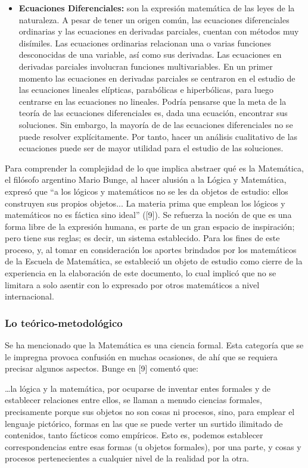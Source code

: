 \begin{itemize}
    \color{blue} \item \color{black} \textbf{Ecuaciones Diferenciales:} son la expresión matemática de las leyes de la naturaleza. A pesar de tener un origen común, las ecuaciones diferenciales ordinarias y las ecuaciones en derivadas parciales, cuentan con métodos muy disímiles. Las ecuaciones ordinarias relacionan una o varias funciones desconocidas de una variable, así como sus derivadas. Las ecuaciones en derivadas parciales involucran funciones multivariables. En un primer momento las ecuaciones en derivadas parciales se centraron en el estudio de las ecuaciones lineales elípticas, parabólicas e hiperbólicas, para luego centrarse en las ecuaciones no lineales. Podría pensarse que la meta de la teoría de las ecuaciones diferenciales es, dada una ecuación, encontrar sus soluciones. Sin embargo, la mayoría de de las ecuaciones diferenciales no se puede resolver explícitamente. Por tanto, hacer un análisis cualitativo de las ecuaciones puede ser de mayor utilidad para el estudio de las soluciones.
    \end{itemize}

Para comprender la complejidad de lo que implica abstraer qué es la Matemática, el filósofo argentino Mario Bunge, al hacer alusión a la Lógica y Matemática, expresó que “a los lógicos y matemáticos no se les da objetos de estudio: ellos construyen sus propios objetos... La materia prima que emplean los lógicos y matemáticos no es fáctica sino ideal” ([9]). Se refuerza la noción de que es
una forma libre de la expresión humana, es parte de un gran espacio de inspiración; pero tiene sus reglas; es decir, un sistema establecido. Para los fines de este proceso, y, al tomar en consideración los aportes brindados por los matemáticos de la Escuela de Matemática, se estableció un objeto de estudio como cierre de la experiencia en la elaboración de este documento, lo cual implicó que no se limitara a solo asentir con lo expresado por otros matemáticos a nivel internacional. 

\subsubsection{Lo teórico-metodológico}

Se ha mencionado que la Matemática es una ciencia formal. Esta categoría que se le impregna provoca confusión en muchas ocasiones, de ahí que se requiera precisar algunos aspectos. Bunge en [9] comentó que: 

…la lógica y la matemática, por ocuparse de inventar entes formales y de establecer relaciones entre ellos, se llaman a menudo ciencias formales, precisamente porque sus objetos no son cosas ni procesos, sino, para emplear el lenguaje pictórico, formas en las que se puede verter un surtido ilimitado de contenidos, tanto fácticos como empíricos. Esto es, podemos establecer correspondencias entre esas formas (u objetos formales), por una parte, y cosas y procesos pertenecientes a cualquier nivel de la realidad por la otra.


